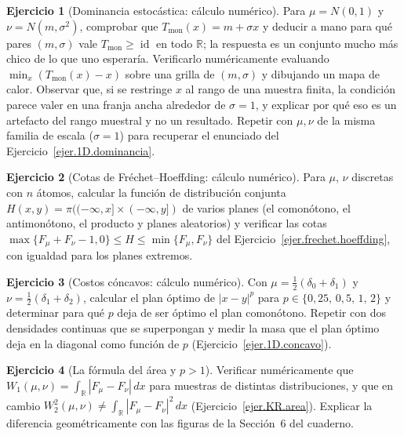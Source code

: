 \documentclass[12pt, a4paper]{amsbook}
\newcommand{\id}{\operatorname{id}}
\newcommand{\R}{{\mathbb R}}
\theoremstyle{remark}
\theoremstyle{definition}
\newtheorem{ejercicio}{Ejercicio}[chapter]
\numberwithin{section}{chapter}
\numberwithin{subsection}{section}
\numberwithin{equation}{section}
\numberwithin{figure}{chapter}
\begin{document}
\begin{ejercicio}[Dominancia estocástica: cálculo numérico]\label{ejc.1D.dominancia}
Para $\mu=N(0,1)$ y $\nu=N(m,\sigma^2)$, comprobar que
$T_{\mathrm{mon}}(x)=m+\sigma x$ y deducir a mano para qué pares
$(m,\sigma)$ vale $T_{\mathrm{mon}}\ge\id$ en todo $\R$; la respuesta es un
conjunto mucho más chico de lo que uno esperaría. Verificarlo numéricamente
evaluando $\min_x(T_{\mathrm{mon}}(x)-x)$ sobre una grilla de $(m,\sigma)$ y
dibujando un mapa de calor. Observar que, si se restringe $x$ al rango de una
muestra finita, la condición parece valer en una franja ancha alrededor de
$\sigma=1$, y explicar por qué eso es un artefacto del rango muestral y no un
resultado. Repetir con $\mu,\nu$ de la misma familia de escala ($\sigma=1$)
para recuperar el enunciado del Ejercicio~\ref{ejer.1D.dominancia}.
\end{ejercicio}

\begin{ejercicio}[Cotas de Fréchet--Hoeffding: cálculo numérico]\label{ejc.1D.frechet}
Para $\mu$, $\nu$ discretas con $n$ átomos, calcular la función de
distribución conjunta $H(x,y)=\pi((-\infty,x]\times(-\infty,y])$ de varios
planes (el comonótono, el antimonótono, el producto y planes aleatorios) y
verificar las cotas $\max\{F_\mu+F_\nu-1,0\}\le H\le\min\{F_\mu,F_\nu\}$ del
Ejercicio~\ref{ejer.frechet.hoeffding}, con igualdad para los planes extremos.
\end{ejercicio}

\begin{ejercicio}[Costos cóncavos: cálculo numérico]\label{ejc.1D.concavos}
Con $\mu=\frac12(\delta_0+\delta_1)$ y $\nu=\frac12(\delta_1+\delta_2)$,
calcular el plan óptimo de $|x-y|^p$ para $p\in\{0{,}25,\,0{,}5,\,1,\,2\}$ y
determinar para qué $p$ deja de ser óptimo el plan comonótono. Repetir con dos
densidades continuas que se superpongan y medir la masa que el plan óptimo
deja en la diagonal como función de $p$ (Ejercicio~\ref{ejer.1D.concavo}).
\end{ejercicio}

\begin{ejercicio}[La fórmula del área y $p>1$]\label{ejc.1D.area}
Verificar numéricamente que $W_1(\mu,\nu)=\int_\R|F_\mu-F_\nu|\,dx$ para
muestras de distintas distribuciones, y que en cambio
$W_2^2(\mu,\nu)\ne\int_\R|F_\mu-F_\nu|^2\,dx$
(Ejercicio~\ref{ejer.KR.area}). Explicar la diferencia geométricamente con
las figuras de la Sección~6 del cuaderno.
\end{ejercicio}
\end{document}

